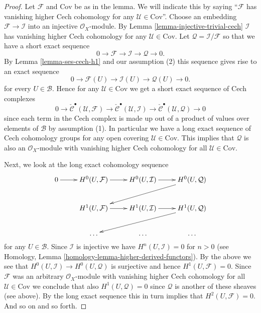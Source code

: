 \begin{proof}
Let $\mathcal{F}$ and $\text{Cov}$ be as in the lemma.
We will indicate this by saying ``$\mathcal{F}$ has vanishing higher
Cech cohomology for any $\mathcal{U} \in \text{Cov}$''.
Choose an embedding $\mathcal{F} \to \mathcal{I}$ into an
injective $\mathcal{O}_X$-module.
By Lemma \ref{lemma-injective-trivial-cech} $\mathcal{I}$
has vanishing higher Cech cohomology for any $\mathcal{U} \in \text{Cov}$.
Let $\mathcal{Q} = \mathcal{I}/\mathcal{F}$
so that we have a short exact sequence
$$
0 \to \mathcal{F} \to \mathcal{I} \to \mathcal{Q} \to 0.
$$
By Lemma \ref{lemma-ses-cech-h1} and our assumption (2)
this sequence gives rise to an exact sequence
$$
0 \to \mathcal{F}(U) \to \mathcal{I}(U) \to \mathcal{Q}(U) \to 0.
$$
for every $U \in \mathcal{B}$. Hence for any $\mathcal{U} \in \text{Cov}$
we get a short exact sequence of Cech complexes
$$
0 \to
\check{\mathcal{C}}^\bullet(\mathcal{U}, \mathcal{F}) \to
\check{\mathcal{C}}^\bullet(\mathcal{U}, \mathcal{I}) \to
\check{\mathcal{C}}^\bullet(\mathcal{U}, \mathcal{Q}) \to 0
$$
since each term in the Cech complex is made up out of a product of
values over elements of $\mathcal{B}$ by assumption (1).
In particular we have a long exact sequence of Cech cohomology
groups for any open covering $\mathcal{U} \in \text{Cov}$.
This implies that $\mathcal{Q}$ is also an $\mathcal{O}_X$-module
with vanishing higher Cech cohomology for all
$\mathcal{U} \in \text{Cov}$.

\medskip\noindent
Next, we look at the long exact cohomology sequence
$$
\xymatrix{
0 \ar[r] &
H^0(U, \mathcal{F}) \ar[r] &
H^0(U, \mathcal{I}) \ar[r] &
H^0(U, \mathcal{Q}) \ar[lld] \\
&
H^1(U, \mathcal{F}) \ar[r] &
H^1(U, \mathcal{I}) \ar[r] &
H^1(U, \mathcal{Q}) \ar[lld] \\
&
\ldots & \ldots & \dots \\
}
$$
for any $U \in \mathcal{B}$. Since $\mathcal{I}$ is injective we
have $H^n(U, \mathcal{I}) = 0$ for $n > 0$ (see
Homology, Lemma \ref{homology-lemma-higher-derived-functors}).
By the above we see that $H^0(U, \mathcal{I}) \to H^0(U, \mathcal{Q})$
is surjective and hence $H^1(U, \mathcal{F}) = 0$.
Since $\mathcal{F}$ was an arbitrary $\mathcal{O}_X$-module with
vanishing higher Cech cohomology for all $\mathcal{U} \in \text{Cov}$
we conclude that also $H^1(U, \mathcal{Q}) = 0$ since $\mathcal{Q}$ is
another of these sheaves (see above). By the long exact sequence this in
turn implies that $H^2(U, \mathcal{F}) = 0$. And so on and so forth.
\end{proof}

